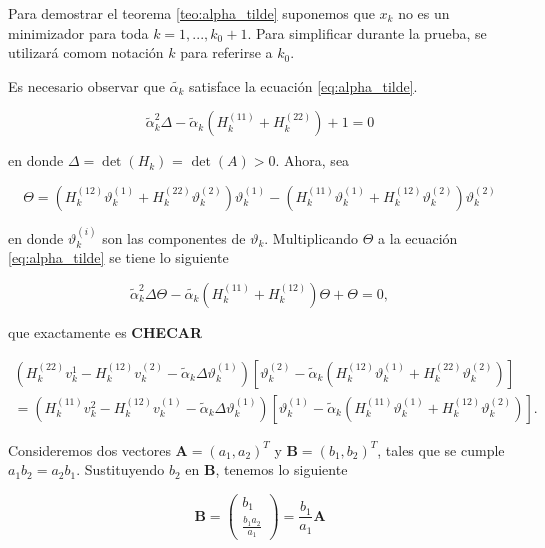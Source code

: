 Para demostrar el teorema \ref{teo:alpha_tilde} suponemos que $x_k$ no es un minimizador para toda $k=1, ..., k_0+1$. Para simplificar durante la prueba, se utilizará comom notación $k$ para referirse a $k_0$.

Es necesario observar que $\tilde{\alpha_k}$ satisface la ecuación \ref{eq:alpha_tilde}.

\begin{equation}
    \tilde{\alpha}^2_k\Delta-\tilde{\alpha}_k\left(H^{(11)}_k + H_k^{(22)}\right) + 1 = 0
    \label{eq:alpha_tilde}
\end{equation}

en donde $\Delta = \det{(H_k)}$ = $\det{(A)}>0$. Ahora, sea

\begin{equation*}
    \Theta = \left(H_k^{(12)}\vartheta_k^{(1)}+ H_k^{(22)}\vartheta^{(2)}_k\right)\vartheta_k^{(1)} -  \left(H_k^{(11)}\vartheta_k^{(1)}+ H_k^{(12)}\vartheta^{(2)}_k\right)\vartheta_k^{(2)}
\end{equation*}

en donde $\vartheta_k^{(i)}$ son las componentes de $\vartheta_k$. Multiplicando $\Theta$ a la ecuación \ref{eq:alpha_tilde} se tiene lo siguiente

\begin{equation*}
    \tilde{\alpha}_k^2\Delta\Theta-\tilde{\alpha_k}\left(H_k^{(11)}+H_k^{(12)}\right)\Theta + \Theta = 0,
\end{equation*}

que exactamente es  \bfseries  CHECAR \normalfont

\begin{align*}
    (H_k^{(22)}v_k^{1}-H_k^{(12)}v_k^{(2)}-\tilde{\alpha}_k\Delta\vartheta_k^{(1)})[\vartheta_k ^{(2)}-\tilde{\alpha}_k(H_k^{(12)}\vartheta_k^{(1)}+H_k^{(22)}\vartheta_k^{(2)})] \\
    = (H_k^{(11)}v_k^{2}-H_k^{(12)}v_k^{(1)}-\tilde{\alpha}_k\Delta\vartheta_k^{(1)})[\vartheta_k ^{(1)}-\tilde{\alpha}_k(H_k^{(11)}\vartheta_k^{(1)}+H_k^{(12)}\vartheta_k^{(2)})].
\end{align*}

Consideremos dos vectores $\boldsymbol{A} = (a_1, a_2)^T$ y $\boldsymbol{B} = (b_1, b_2)^T$, tales que se cumple $a_1b_2 = a_2b_1$. Sustituyendo $b_2$ en $\boldsymbol{B}$, tenemos lo siguiente

\begin{equation*}
    \boldsymbol{B} = \begin{pmatrix}
        b_1 \\
        \frac{b_1a_2}{a_1}
    \end{pmatrix} = \frac{b_1}{a_1}\boldsymbol{A}
\end{equation*}

